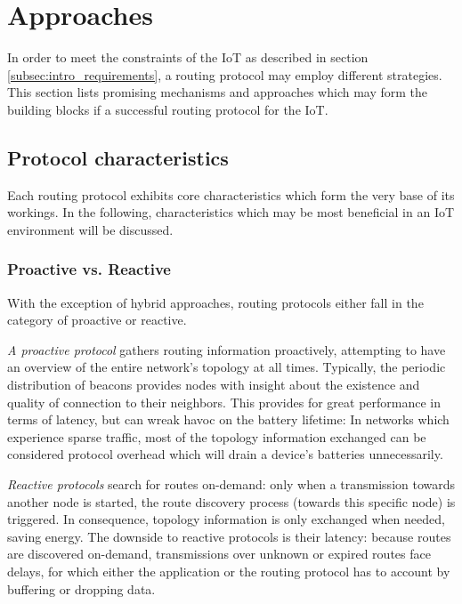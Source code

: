 \section{Approaches}
\label{sec:approaches}
In order to meet the constraints of the \gls{IoT} as described in section \ref{subsec:intro_requirements}, a routing protocol may employ different strategies. This section lists promising mechanisms and approaches which may form the building blocks if a successful routing protocol for the IoT.

\subsection{Protocol characteristics}
\label{subsec:appr_protocol_characteristics}
Each routing protocol exhibits core characteristics which form the very base of its workings.
In the following, characteristics which may be most beneficial in an \gls{IoT} environment will be discussed.

\subsubsection{Proactive vs. Reactive}
\label{subsec:appr_char_reactive}
With the exception of hybrid approaches, routing protocols either fall in the category of proactive or reactive.
\begin{description}
\item{\emph{A proactive protocol}} gathers routing information proactively, attempting to have an overview of the entire network's topology at all times. Typically, the periodic distribution of \glspl{beacon} provides nodes with insight about the existence and quality of connection to their neighbors.
This provides for great performance in terms of latency, but can wreak havoc on the battery lifetime: In networks which experience sparse traffic, most of the topology information exchanged can be considered protocol overhead which will drain a device's batteries unnecessarily.
\item{\emph{Reactive protocols}} search for routes on-demand: only when a transmission towards another node is started, the route discovery process (towards this specific node) is triggered. In consequence, topology information is only exchanged when needed, saving energy. The downside to reactive protocols is their latency: because routes are discovered on-demand, transmissions over unknown or expired routes face delays, for which either the application or the routing protocol has to account by buffering or dropping data.
\end{description}

